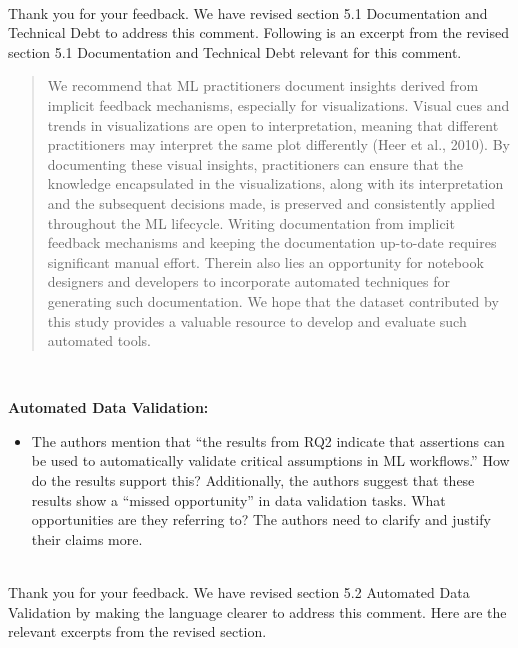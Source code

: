 \documentclass[11pt,fleqn]{article}
\newcommand{\eline}{\vspace*{.75\baselineskip}}
\newcommand{\Referee}[1]{\eline \noindent {\bf Reviewer comment #1:} \\}
\newcommand{\Us}{\eline \noindent {\bf Response:}\\}
\newenvironment{revcomment}[1][]
{\Referee{#1}\begin{rcomment}}
{\end{rcomment}}
\begin{document}
\Us Thank you for your feedback. We have revised section 5.1 Documentation and Technical Debt to address this comment. Following is an excerpt from the revised section 5.1 Documentation and Technical Debt relevant for this comment.

\begin{quote}
  We recommend that ML practitioners document insights derived from implicit feedback mechanisms, especially for visualizations. Visual cues and trends in visualizations are open to interpretation, meaning that different practitioners may interpret the same plot differently (Heer et al., 2010). By documenting these visual insights, practitioners can ensure that the knowledge encapsulated in the visualizations, along with its interpretation and the subsequent decisions made, is preserved and consistently applied throughout the ML lifecycle. Writing documentation from implicit feedback mechanisms and keeping the documentation up-to-date requires significant manual effort. Therein also lies an opportunity for notebook designers and developers to incorporate automated techniques for generating such documentation. We hope that the dataset contributed by this study provides a valuable resource to develop and evaluate such automated tools.
\end{quote}

\begin{revcomment}[3.12]
  \textbf{Automated Data Validation:}

  \begin{itemize}
    \item The authors mention that ``the results from RQ2 indicate that assertions can be used to automatically validate critical assumptions in ML workflows.'' How do the results support this? Additionally, the authors suggest that these results show a ``missed opportunity'' in data validation tasks. What opportunities are they referring to? The authors need to clarify and justify their claims more.
  \end{itemize}
\end{revcomment}

\Us Thank you for your feedback. We have revised section 5.2 Automated Data Validation by making the language clearer to address this comment. Here are the relevant excerpts from the revised section.
\end{document}
